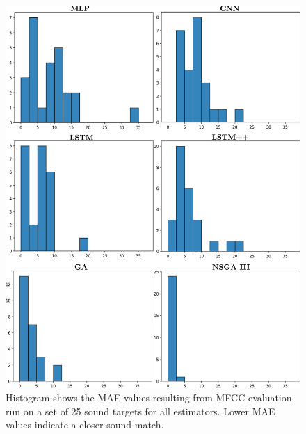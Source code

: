\begin{figure}[t]
\begin{center}
\includegraphics[width=0.98\columnwidth]{hist_group_v3.png}
\caption{Histogram shows the MAE values resulting from MFCC evaluation run on a set of 25 sound targets for all estimators. Lower MAE values indicate a closer sound match.}
\label{fig:group_hist}
\end{center}
\end{figure}

